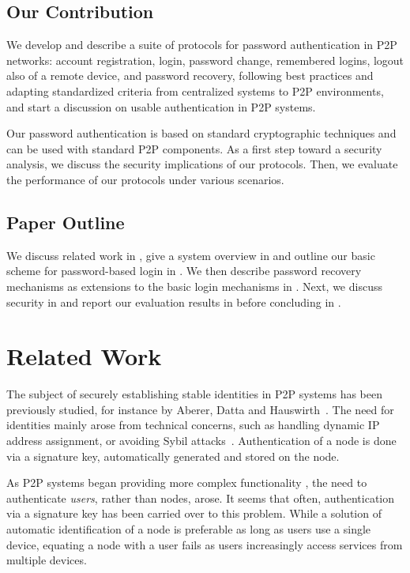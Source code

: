 \subsection{Our Contribution}
We develop and describe a suite of protocols for password
authentication in P2P networks: account registration, login,
password change, remembered logins, logout also of a remote device, and password
recovery, following best practices and adapting standardized criteria
from centralized systems to P2P environments, and start a
discussion on usable authentication in P2P systems.

Our password authentication is based on standard
cryptographic techniques and can be used with standard P2P components. As a
first step toward a security analysis, we discuss the security implications of
our protocols. Then, we evaluate the performance of our protocols under various
scenarios.

\subsection{Paper Outline}
We discuss related work in , give a system
overview in  and outline our basic scheme for
password-based login in . We then describe
password recovery mechanisms as extensions to the basic login
mechanisms in . Next, we discuss security in
 and report our evaluation results in
 before concluding in .

\section{Related Work} 

The subject of securely establishing stable identities in P2P systems has been
previously studied, for instance by Aberer, Datta and
Hauswirth~\cite{AbererDH04}. The need for identities mainly arose from
technical concerns, such as handling dynamic IP address assignment, or
avoiding Sybil attacks~\cite{Douceur02}. Authentication of a node is done via
a signature key, automatically generated and stored on the node.

As P2P systems began providing more complex functionality
\cite{IsdalPKA10,Cutillo09a,AbbasPES09,LillibridgeEBBI03}, the need to authenticate
\emph{users}, rather than nodes, arose. It seems that often, authentication
via a signature key has been carried over to this problem. While a solution
of automatic identification of a node is preferable as long as users use a
single device, equating a node with a user fails as users increasingly access
services from multiple devices.

